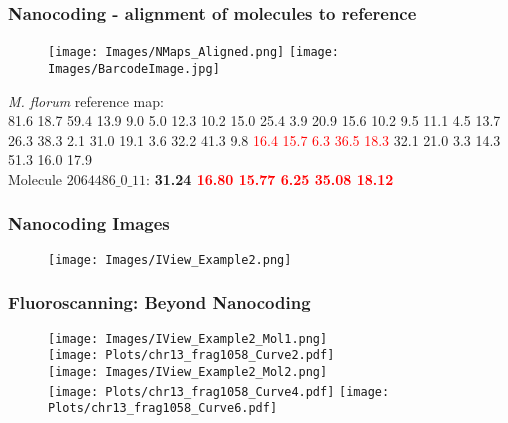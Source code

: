 \documentclass[10pt,dvipsnames,table]{beamer}
\begin{document}
\begin{frame}
\frametitle{Nanocoding - alignment of molecules to reference}
\vspace{-1cm}
\begin{figure}[t]
\texttt{[image: Images/NMaps\_Aligned.png]}
\hspace{1cm}
\texttt{[image: Images/BarcodeImage.jpg]}
\end{figure}

{\emph{M. florum}} reference map: \\
{\footnotesize{81.6 18.7 59.4 13.9 9.0 5.0 12.3 10.2 15.0 25.4 3.9 20.9 15.6 10.2 9.5 11.1 4.5 
13.7 26.3 38.3 2.1 31.0 19.1 3.6 32.2 41.3 9.8}} \textcolor{Red}{16.4 15.7 6.3 36.5 18.3} {\footnotesize{32.1 21.0 
3.3 14.3 51.3 16.0 17.9}} \\
\vspace{0.5cm}
Molecule {\small{$2064486\_0\_11$}}: {\bf{31.24 \textcolor{Red}{16.80  15.77  6.25  35.08  18.12}}}


\end{frame}

\begin{frame}
\frametitle{Nanocoding Images}
\begin{center}
\begin{figure}[H]
\texttt{[image: Images/IView\_Example2.png]}
\end{figure}
\end{center}
\end{frame}

\begin{frame}
\frametitle{Fluoroscanning: Beyond Nanocoding}
\begin{figure}[H]
\texttt{[image: Images/IView\_Example2\_Mol1.png]} \\
\texttt{[image: Plots/chr13\_frag1058\_Curve2.pdf]} \\

\texttt{[image: Images/IView\_Example2\_Mol2.png]} \\
\texttt{[image: Plots/chr13\_frag1058\_Curve4.pdf]} 
\texttt{[image: Plots/chr13\_frag1058\_Curve6.pdf]} 
\end{figure}

\end{frame}
\end{document}
